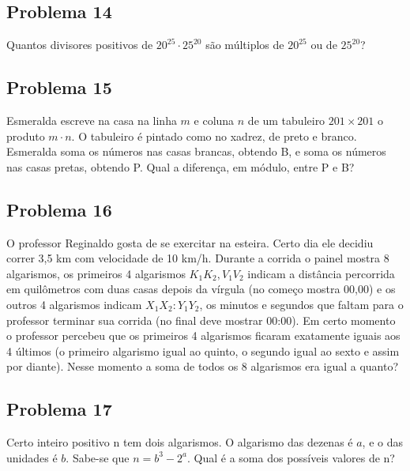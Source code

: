 \documentclass[12pt]{article}
\begin{document}
\clearpage

\subsection{Problema 14}
\begin{tcolorbox}[statementbox]
  Quantos divisores positivos de \(20^{25} \cdot 25^{20}\) são múltiplos de $20^{25}$ ou de $25^{20}$?
\end{tcolorbox}

\clearpage

\subsection{Problema 15}
\begin{tcolorbox}[statementbox]
Esmeralda escreve na casa na linha \(m\) e coluna \(n\) de um tabuleiro \(201 \times 201\) o produto \(m \cdot n\). O tabuleiro 
é pintado como no xadrez, de preto e branco. Esmeralda soma os números nas casas brancas, obtendo B, e soma os números nas casas
pretas, obtendo P. Qual a diferença, em módulo, entre P e B?
\end{tcolorbox}

\clearpage

\subsection{Problema 16}
\begin{tcolorbox}[statementbox]
O professor Reginaldo gosta de se exercitar na esteira. Certo dia ele decidiu correr 3,5 km com velocidade de 10 km/h. Durante a corrida o painel mostra 
8 algarismos, os primeiros 4 algarismos \(K_1K_2,V_1V_2\) indicam a distância percorrida em quilômetros com duas casas depois da vírgula (no começo mostra 00,00) e os outros
4 algarismos indicam \(X_1X_2:Y_1Y_2\), os minutos e segundos que faltam para o professor terminar sua corrida (no final deve mostrar 00:00). Em certo momento o professor
percebeu que os primeiros 4 algarismos ficaram exatamente iguais aos 4 últimos (o primeiro algarismo igual ao quinto, o segundo igual ao sexto e assim por diante). Nesse
momento a soma de todos os 8 algarismos era igual a quanto?
\end{tcolorbox}

\clearpage

\subsection{Problema 17}
\begin{tcolorbox}[statementbox]
Certo inteiro positivo n tem dois algarismos. O algarismo das dezenas é \(a\), e o das unidades é \(b\). Sabe-se que \(n = b^3 - 2^a\). Qual é a soma dos possíveis
valores de n?
\end{tcolorbox}
\end{document}
